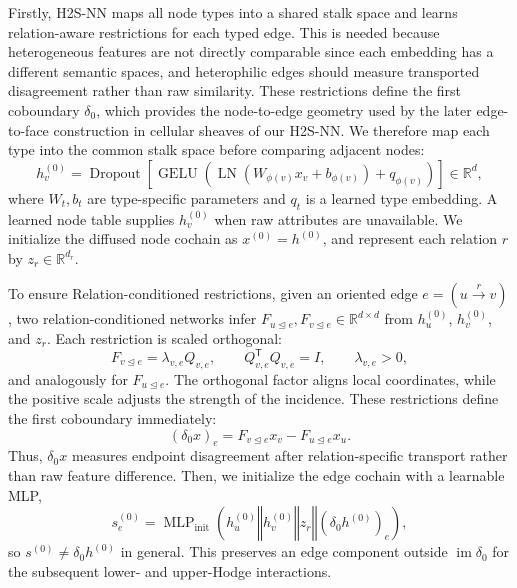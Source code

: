 \documentclass[sigconf,anonymous,review]{acmart}
\newcommand{\R}{\mathbb{R}}
\newcommand{\method}{\textsc{H2S-NN}}
\newcommand{\transpose}{\mathsf{T}}
\newcommand{\concat}{\mathbin\Vert}
\begin{document}
Firstly, \method{} maps all node types into a shared stalk space and learns relation-aware restrictions
for each typed edge. This is needed because heterogeneous features are not directly comparable since each embedding has a different semantic spaces, and heterophilic edges should measure transported disagreement rather than raw similarity. These
restrictions define the first coboundary \(\delta_0\), which provides the node-to-edge geometry used
by the later edge-to-face construction in cellular sheaves of our \method{}. We therefore map
each type into the common stalk space before comparing adjacent nodes:
\begin{equation}
  h_v^{(0)}
  =\operatorname{Dropout}\!\left[
    \operatorname{GELU}\!\left(
      \operatorname{LN}(W_{\phi(v)}x_v+b_{\phi(v)})+q_{\phi(v)}
    \right)
  \right]\in\R^d ,
  \label{eq:node-encoder}
\end{equation}
where \(W_t,b_t\) are type-specific parameters and \(q_t\) is a learned type embedding.  A learned
node table supplies \(h_v^{(0)}\) when raw attributes are unavailable.  We initialize the diffused
node cochain as \(x^{(0)}=h^{(0)}\), and represent each relation \(r\) by
\(z_r\in\R^{d_r}\).

To ensure Relation-conditioned restrictions, given an oriented edge \(e=(u\xrightarrow{r}v)\), two relation-conditioned networks infer
\(F_{u\unlhd e},F_{v\unlhd e}\in\R^{d\times d}\) from
\(h_u^{(0)}\), \(h_v^{(0)}\), and \(z_r\).  Each restriction is scaled orthogonal:
\begin{equation}
  F_{v\unlhd e}=\lambda_{v,e}Q_{v,e},
  \qquad Q_{v,e}^{\transpose}Q_{v,e}=I,
  \qquad \lambda_{v,e}>0 ,
  \label{eq:conformal-map}
\end{equation}
and analogously for \(F_{u\unlhd e}\).  The orthogonal factor aligns local coordinates, while the
positive scale adjusts the strength of the incidence.  These restrictions define the first
coboundary immediately:
\begin{equation}
  (\delta_0x)_e
  =F_{v\unlhd e}x_v-F_{u\unlhd e}x_u .
  \label{eq:delta0}
\end{equation}
Thus, \(\delta_0x\) measures endpoint disagreement after relation-specific transport rather than
raw feature difference. Then, we initialize the edge cochain with a learnable MLP,
\begin{equation}
  s_e^{(0)}
  =\operatorname{MLP}_{\mathrm{init}}\!\left(
    h_u^{(0)}\concat h_v^{(0)}\concat z_r
    \concat(\delta_0h^{(0)})_e
  \right),
  \label{eq:edge-init}
\end{equation}
so \(s^{(0)}\neq\delta_0h^{(0)}\) in general.  This preserves an edge component outside
\(\operatorname{im}\delta_0\) for the subsequent lower- and upper-Hodge interactions.
\end{document}
